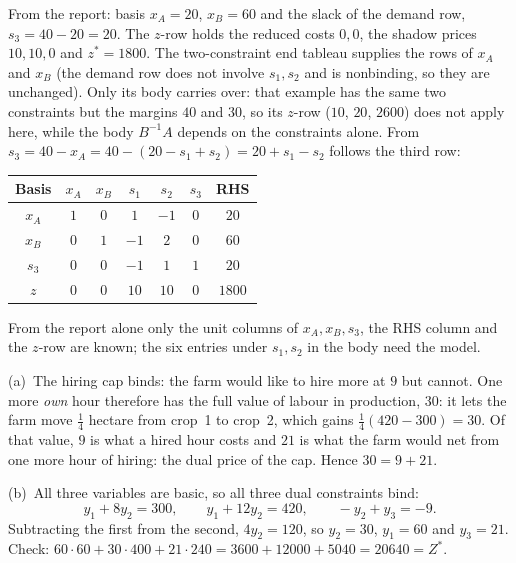 \begin{solutions}
  \item From the report: basis $x_{A}=20$, $x_{B}=60$ and the slack of the
        demand row, $s_{3}=40-20=20$. The $z$-row holds the reduced costs
        $0,0$, the shadow prices $10,10,0$ and $z^{*}=1800$. The
        two-constraint end tableau supplies the rows of $x_{A}$ and
        $x_{B}$ (the demand row does not involve $s_{1},s_{2}$ and is
        nonbinding, so they are unchanged). Only its body carries over:
        that example has the same two constraints but the margins $40$
        and $30$, so its $z$-row ($10$, $20$, $2600$) does not apply here,
        while the body $B^{-1}A$ depends on the constraints alone. From
        $s_{3}=40-x_{A}=40-(20-s_{1}+s_{2})=20+s_{1}-s_{2}$ follows the
        third row:
        \begin{center}\footnotesize
        \begin{tabular}{c|ccccc|c}
        Basis & $x_{A}$ & $x_{B}$ & $s_{1}$ & $s_{2}$ & $s_{3}$ & RHS\\
        \hline
        $x_{A}$ & $1$ & $0$ & $1$ & $-1$ & $0$ & $20$\\
        $x_{B}$ & $0$ & $1$ & $-1$ & $2$ & $0$ & $60$\\
        $s_{3}$ & $0$ & $0$ & $-1$ & $1$ & $1$ & $20$\\
        \hline
        $z$ & $0$ & $0$ & $10$ & $10$ & $0$ & $1800$\\
        \end{tabular}
        \end{center}
        From the report alone only the unit columns of $x_{A},x_{B},s_{3}$,
        the RHS column and the $z$-row are known; the six entries under
        $s_{1},s_{2}$ in the body need the model.

  \item (a)~The hiring cap binds: the farm would like to hire more at
        $9$ but cannot. One more \emph{own} hour therefore has the full
        value of labour in production, $30$: it lets the farm move
        $\tfrac14$ hectare from crop~1 to crop~2, which gains
        $\tfrac14(420-300)=30$. Of that value, $9$ is what a hired hour
        costs and $21$ is what the farm would net from one more hour of
        hiring: the dual price of the cap. Hence $30=9+21$.

        (b)~All three variables are basic, so all three dual constraints
        bind:
        \[
          y_{1}+8y_{2}=300,\qquad y_{1}+12y_{2}=420,\qquad -y_{2}+y_{3}=-9 .
        \]
        Subtracting the first from the second, $4y_{2}=120$, so
        $y_{2}=30$, $y_{1}=60$ and $y_{3}=21$. Check:
        $60\cdot60+30\cdot400+21\cdot240=3600+12000+5040=20640=Z^{*}$.
        \checkmark


\end{solutions}
